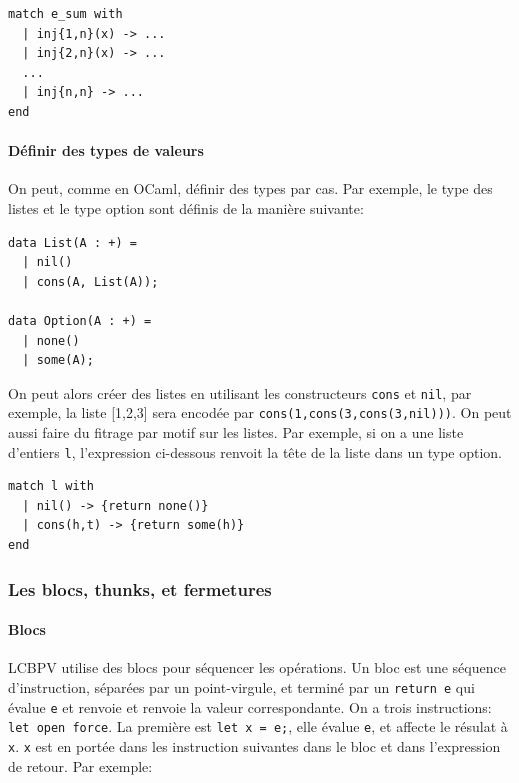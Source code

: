 \documentclass[12pt]{article}
\begin{document}
\begin{verbatim}
match e_sum with
  | inj{1,n}(x) -> ...
  | inj{2,n}(x) -> ...
  ...
  | inj{n,n} -> ...
end
\end{verbatim}

\hypertarget{duxe9finir-des-types-de-valeurs}{%
      \paragraph*{Définir des types de
            valeurs}\label{duxe9finir-des-types-de-valeurs}}

On peut, comme en OCaml, définir des types par cas. Par exemple, le type
des listes et le type option sont définis de la manière suivante:

\begin{verbatim}
data List(A : +) =
  | nil()
  | cons(A, List(A));

data Option(A : +) =
  | none()
  | some(A);
\end{verbatim}

On peut alors créer des listes en utilisant les constructeurs
\texttt{cons} et \texttt{nil}, par exemple, la liste {[}1,2,3{]} sera
encodée par \texttt{cons(1,cons(3,cons(3,nil)))}. On peut aussi faire du
fitrage par motif sur les listes. Par exemple, si on a une liste
d'entiers \texttt{l}, l'expression ci-dessous renvoit la tête de la
liste dans un type option.

\begin{verbatim}
match l with 
  | nil() -> {return none()}
  | cons(h,t) -> {return some(h)}
end 
\end{verbatim}

\hypertarget{les-blocs-thunks-et-fermetures}{%
      \subsubsection*{Les blocs, thunks, et
            fermetures}\label{les-blocs-thunks-et-fermetures}}

\hypertarget{blocs}{%
      \paragraph*{Blocs}\label{blocs}}

LCBPV utilise des blocs pour séquencer les opérations. Un bloc est une
séquence d'instruction, séparées par un point-virgule, et terminé par un
\texttt{return\ e} qui évalue \texttt{e} et renvoie et renvoie la valeur
correspondante. On a trois instructions: \texttt{let\ open\ force}. La
première est \texttt{let\ x\ =\ e;}, elle évalue \texttt{e}, et affecte
le résulat à \texttt{x}. \texttt{x} est en portée dans les instruction
suivantes dans le bloc et dans l'expression de retour. Par exemple:
\end{document}
